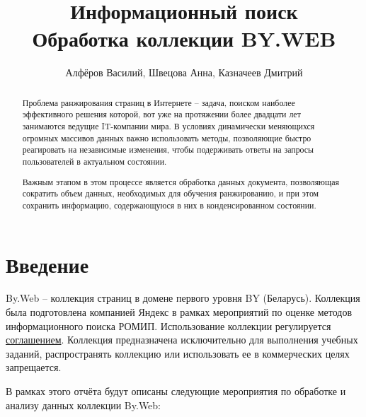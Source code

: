 \documentclass[twocolumn]{article}
\title{Информационный поиск\\ Обработка коллекции BY.WEB}
\author{Алфёров Василий, Швецова Анна, Казначеев Дмитрий}
\begin{document}
\maketitle        

\begin{abstract}
	Проблема ранжирования страниц в Интернете -- задача, поиском наиболее эффективного решения которой, вот уже на протяжении более двадцати лет занимаются ведущие IT-компании мира. В условиях динамически меняющихся огромных массивов данных важно использовать методы, позволяющие быстро реагировать на независимые изменения, чтобы подерживать ответы на запросы пользователей в актуальном состоянии. 
	
	Важным этапом в этом процессе является обработка данных документа, позволяющая сократить объем данных, необходимых для обучения ранжированию, и при этом сохранить информацию, содержающуюся в них в конденсированном состоянии. 
\end{abstract}

\section{Введение}

By.Web -- коллекция страниц в домене первого уровня BY (Беларусь). Коллекция была подготовлена компанией Яндекс в рамках мероприятий по оценке методов информационного поиска РОМИП. Использование коллекции регулируется \href{http://romip.ru/romip_agreement_for_nonparticipants2015_signed.pdf}{соглашением}. Коллекция предназначена исключительно для выполнения учебных заданий, распространять коллекцию или использовать ее в коммерческих целях запрещается.	

В рамках этого отчёта будут описаны следующие мероприятия по обработке и анализу данных коллекции By.Web:
\end{document}
